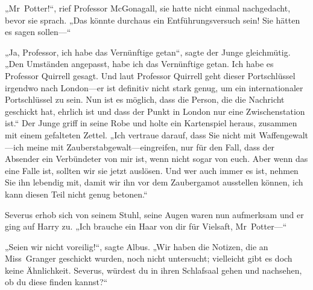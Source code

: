 „Mr~Potter!“, rief Professor McGonagall, sie hatte nicht einmal nachgedacht, bevor sie sprach.
„Das könnte durchaus ein Entführungsversuch sein! Sie hätten es sagen sollen—“

„Ja, Professor, ich habe das Vernünftige getan“, sagte der Junge gleichmütig.
„Den Umständen angepasst, habe ich das Vernünftige getan. Ich habe es Professor Quirrell gesagt. Und laut Professor Quirrell geht dieser Portschlüssel irgendwo nach London—er ist definitiv nicht stark genug, um ein internationaler Portschlüssel zu sein. Nun ist es möglich, dass die Person, die die Nachricht geschickt hat, ehrlich ist und dass der Punkt in London nur eine Zwischenstation ist.“ Der Junge griff in seine Robe und holte ein Kartenspiel heraus, zusammen mit einem gefalteten Zettel.
„Ich vertraue darauf, dass Sie nicht mit Waffengewalt—ich meine mit Zauberstabgewalt—eingreifen, nur für den Fall, dass der Absender ein Verbündeter von mir ist, wenn nicht sogar von euch. Aber wenn das eine Falle ist, sollten wir sie jetzt auslösen. Und wer auch immer es ist, nehmen Sie ihn lebendig mit, damit wir ihn vor dem Zaubergamot ausstellen können, ich kann diesen Teil nicht genug betonen.“

Severus erhob sich von seinem Stuhl, seine Augen waren nun aufmerksam und er ging auf Harry zu.
„Ich brauche ein Haar von dir für Vielsaft, Mr~Potter—“

„Seien wir nicht voreilig!“, sagte Albus.
„Wir haben die Notizen, die an Miss~Granger geschickt wurden, noch nicht untersucht; vielleicht gibt es doch keine Ähnlichkeit. Severus, würdest du in ihren Schlafsaal gehen und nachsehen, ob du diese finden kannst?“

